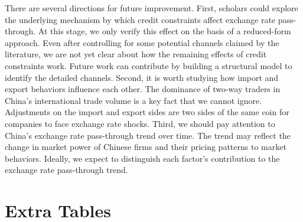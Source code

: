 There are several directions for future improvement. First, scholars could explore the underlying mechanism by which credit constraints affect exchange rate pass-through. At this stage, we only verify this effect on the basis of a reduced-form approach. Even after controlling for some potential channels claimed by the literature, we are not yet clear about how the remaining effects of credit constraints work. Future work can contribute by building a structural model to identify the detailed channels. Second, it is worth studying how import and export behaviors influence each other. The dominance of two-way traders in China's international trade volume is a key fact that we cannot ignore. Adjustments on the import and export sides are two sides of the same coin for companies to face exchange rate shocks. Third, we should pay attention to China's exchange rate pass-through trend over time. The trend may reflect the change in market power of Chinese firms and their pricing patterns to market behaviors. Ideally, we expect to distinguish each factor's contribution to the exchange rate pass-through trend. 

\newpage 


\appendix

\newpage

\section{Extra Tables}\label{Appendix-Tables}

\setcounter{table}{0}

\renewcommand{\thetable}{A\arabic{table}}

